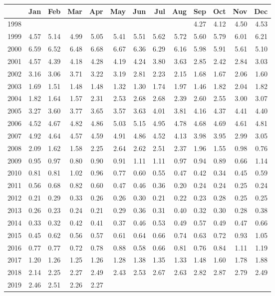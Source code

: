 \begin{longtable}{rrrrrrrrrrrrr}
  \hline
 & Jan & Feb & Mar & Apr & May & Jun & Jul & Aug & Sep & Oct & Nov & Dec \\ 
  \hline
1998 &  &  &  &  &  &  &  &  & 4.27 & 4.12 & 4.50 & 4.53 \\ 
  1999 & 4.57 & 5.14 & 4.99 & 5.05 & 5.41 & 5.51 & 5.62 & 5.72 & 5.60 & 5.79 & 6.01 & 6.21 \\ 
  2000 & 6.59 & 6.52 & 6.48 & 6.68 & 6.67 & 6.36 & 6.29 & 6.16 & 5.98 & 5.91 & 5.61 & 5.10 \\ 
  2001 & 4.57 & 4.39 & 4.18 & 4.28 & 4.19 & 4.24 & 3.80 & 3.63 & 2.85 & 2.42 & 2.84 & 3.03 \\ 
  2002 & 3.16 & 3.06 & 3.71 & 3.22 & 3.19 & 2.81 & 2.23 & 2.15 & 1.68 & 1.67 & 2.06 & 1.60 \\ 
  2003 & 1.69 & 1.51 & 1.48 & 1.48 & 1.32 & 1.30 & 1.74 & 1.97 & 1.46 & 1.82 & 2.04 & 1.82 \\ 
  2004 & 1.82 & 1.64 & 1.57 & 2.31 & 2.53 & 2.68 & 2.68 & 2.39 & 2.60 & 2.55 & 3.00 & 3.07 \\ 
  2005 & 3.27 & 3.60 & 3.77 & 3.65 & 3.57 & 3.63 & 4.01 & 3.81 & 4.16 & 4.37 & 4.41 & 4.40 \\ 
  2006 & 4.52 & 4.67 & 4.82 & 4.86 & 5.03 & 5.15 & 4.95 & 4.78 & 4.68 & 4.69 & 4.61 & 4.81 \\ 
  2007 & 4.92 & 4.64 & 4.57 & 4.59 & 4.91 & 4.86 & 4.52 & 4.13 & 3.98 & 3.95 & 2.99 & 3.05 \\ 
  2008 & 2.09 & 1.62 & 1.58 & 2.25 & 2.64 & 2.62 & 2.51 & 2.37 & 1.96 & 1.55 & 0.98 & 0.76 \\ 
  2009 & 0.95 & 0.97 & 0.80 & 0.90 & 0.91 & 1.11 & 1.11 & 0.97 & 0.94 & 0.89 & 0.66 & 1.14 \\ 
  2010 & 0.81 & 0.81 & 1.02 & 0.96 & 0.77 & 0.60 & 0.55 & 0.47 & 0.42 & 0.34 & 0.45 & 0.59 \\ 
  2011 & 0.56 & 0.68 & 0.82 & 0.60 & 0.47 & 0.46 & 0.36 & 0.20 & 0.24 & 0.24 & 0.25 & 0.24 \\ 
  2012 & 0.21 & 0.29 & 0.33 & 0.26 & 0.26 & 0.30 & 0.21 & 0.22 & 0.23 & 0.28 & 0.25 & 0.25 \\ 
  2013 & 0.26 & 0.23 & 0.24 & 0.21 & 0.29 & 0.36 & 0.31 & 0.40 & 0.32 & 0.30 & 0.28 & 0.38 \\ 
  2014 & 0.33 & 0.32 & 0.42 & 0.41 & 0.37 & 0.46 & 0.53 & 0.49 & 0.57 & 0.49 & 0.47 & 0.66 \\ 
  2015 & 0.45 & 0.62 & 0.56 & 0.57 & 0.61 & 0.64 & 0.66 & 0.74 & 0.63 & 0.72 & 0.93 & 1.05 \\ 
  2016 & 0.77 & 0.77 & 0.72 & 0.78 & 0.88 & 0.58 & 0.66 & 0.81 & 0.76 & 0.84 & 1.11 & 1.19 \\ 
  2017 & 1.20 & 1.26 & 1.25 & 1.26 & 1.28 & 1.38 & 1.35 & 1.33 & 1.48 & 1.60 & 1.78 & 1.88 \\ 
  2018 & 2.14 & 2.25 & 2.27 & 2.49 & 2.43 & 2.53 & 2.67 & 2.63 & 2.82 & 2.87 & 2.79 & 2.49 \\ 
  2019 & 2.46 & 2.51 & 2.26 & 2.27 &  &  &  &  &  &  &  &  \\ 
   \hline
\hline
\end{longtable}

